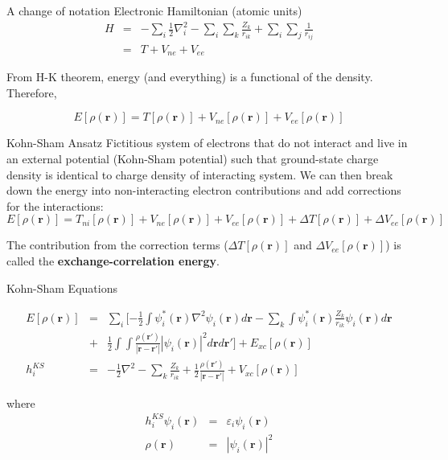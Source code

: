 \documentclass[aspectratio=169]{beamer}
\let \vec \mathbf
\begin{document}
    \begin{frame}{A change of notation}
        Electronic Hamiltonian (atomic units)
        \begin{eqnarray*}
            H & = & -\sum_i \frac{1}{2}\nabla_i^2
            -\sum_i\sum_k \frac{Z_k}{r_{ik}}
            +\sum_i\sum_j \frac{1}{r_{ij}}\\
            & = & T + V_{ne} + V_{ee}
        \end{eqnarray*}

        From H-K theorem, energy (and everything) is a functional of the density. Therefore,

        \begin{equation*}
            E[\rho(\vec{r})] = T[\rho(\vec{r})] + V_{ne}[\rho(\vec{r})] + V_{ee}[\rho(\vec{r})]
        \end{equation*}

    \end{frame}


    \begin{frame}{Kohn-Sham Ansatz}
        Fictitious system of electrons that do not interact and live in an external potential (Kohn-Sham potential) such that ground-state charge density is identical to charge density of interacting system.\cite{shamDensityFunctionalTheoryEnergy1983} We can then break down the energy into non-interacting electron contributions and add corrections for the interactions:
        \begin{equation*}
            E[\rho(\vec{r})] = T_{ni}[\rho(\vec{r})] + V_{ne}[\rho(\vec{r})] + V_{ee}[\rho(\vec{r})] + \Delta T[\rho(\vec{r})] + \Delta V_{ee} [\rho(\vec{r})]
        \end{equation*}

        The contribution from the correction terms ($\Delta T[\rho(\vec{r})]$ and $\Delta V_{ee} [\rho(\vec{r})]$) is called the \textbf{exchange-correlation energy}.

    \end{frame}

    \begin{frame}{Kohn-Sham Equations}

        \begin{eqnarray*}
            E[\rho(\vec{r})] & = & \sum_i [ -\frac{1}{2} \int \psi_i^*(\vec{r}) \nabla^2 \psi_i(\vec{r}) d\vec{r}
            - \sum_k \int \psi_i^*(\vec{r})\frac{Z_k}{r_{ik}} \psi_i(\vec{r}) d\vec{r}  \\
            & + &  \frac{1}{2} \int \int \frac{\rho(\vec{r'})}{|\vec{r}-\vec{r'}|}|\psi_i(\vec{r})|^2 d\vec{r}d\vec{r'} ]+ E_{xc}[\rho(\vec{r})]\\
            h_i^{KS} & = & -\frac{1}{2} \nabla^2
            - \sum_k \frac{Z_k}{r_{ik}} + \frac{1}{2} \frac{\rho(\vec{r'})}{|\vec{r}-\vec{r'}|}+ V_{xc}[\rho(\vec{r})]
        \end{eqnarray*}

        where
        \begin{eqnarray*}
            h_i^{KS} \psi_i(\vec{r}) & = & \varepsilon_i \psi_i(\vec{r}) \\
            \rho(\vec{r}) &=& |\psi_i(\vec{r})|^2
        \end{eqnarray*}
    \end{frame}
\end{document}
